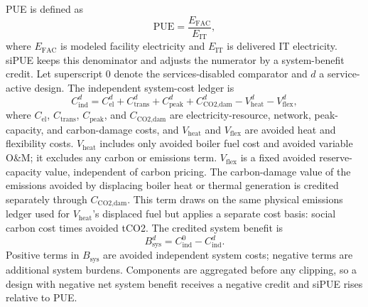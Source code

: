 \documentclass[preprint,12pt]{elsarticle}
\begin{document}
PUE is defined as
\begin{equation}
\text{PUE} = \frac{E_{\text{FAC}}}{E_{\text{IT}}},
\end{equation}
where $E_{\text{FAC}}$ is modeled facility electricity and $E_{\text{IT}}$ is delivered IT electricity. siPUE keeps this denominator and adjusts the numerator by a system-benefit credit. Let superscript $0$ denote the services-disabled comparator and $d$ a service-active design. The independent system-cost ledger is
\begin{equation}
C_{\text{ind}}^d =
C_{\text{el}}^d
+ C_{\text{trans}}^d
+ C_{\text{peak}}^d
+ C_{\text{CO2,dam}}^d
- V_{\text{heat}}^d
- V_{\text{flex}}^d,
\label{eq:independent-cost-ledger}
\end{equation}
where $C_{\text{el}}$, $C_{\text{trans}}$, $C_{\text{peak}}$, and $C_{\text{CO2,dam}}$ are electricity-resource, network, peak-capacity, and carbon-damage costs, and $V_{\text{heat}}$ and $V_{\text{flex}}$ are avoided heat and flexibility costs. $V_{\text{heat}}$ includes only avoided boiler fuel cost and avoided variable O\&M; it excludes any carbon or emissions term. $V_{\text{flex}}$ is a fixed avoided reserve-capacity value, independent of carbon pricing. The carbon-damage value of the emissions avoided by displacing boiler heat or thermal generation is credited separately through $C_{\text{CO2,dam}}$. This term draws on the same physical emissions ledger used for $V_{\text{heat}}$'s displaced fuel but applies a separate cost basis: social carbon cost times avoided tCO2. The credited system benefit is
\begin{equation}
B_{\text{sys}}^d =
C_{\text{ind}}^0 - C_{\text{ind}}^d.
\label{eq:system-benefit}
\end{equation}
Positive terms in $B_{\text{sys}}$ are avoided independent system costs; negative terms are additional system burdens. Components are aggregated before any clipping, so a design with negative net system benefit receives a negative credit and siPUE rises relative to PUE.
\end{document}
